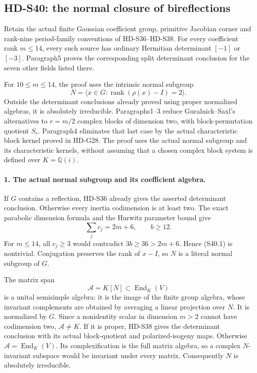 \subsection{HD-S40: the normal closure of bireflections}
\label{sec:bireflection-normal-closure}

Retain the actual finite Gaussian coefficient group, primitive
Jacobian corner and rank-nine period-family conventions of
HD-S36--HD-S38. For every coefficient rank \(m\le14\),
every such source has ordinary Hermitian determinant \([-1]\)
or \([-3]\). Paragraph5 proves the corresponding split
determinant conclusion for the seven other fields listed there.

For \(10\le m\le14\), the proof uses the intrinsic normal
subgroup
\[
 N=\langle x\in G:\operatorname{rank}(\rho(x)-I)=2\rangle.
                                                               \tag{S40.1}
\]
Outside the determinant conclusions already proved using proper
normalized algebras, it is absolutely irreducible. Paragraphs1--3
reduce Guralnick--Saxl's alternatives to \(r=m/2\) complex
blocks of dimension two, with block-permutation quotient \(S_r\).
Paragraph4 eliminates that last case by the actual characteristic
block kernel proved in HD-G28. The proof uses the actual normal
subgroup and its characteristic kernels, without assuming that
a chosen complex block system is defined over \(K=\mathbb Q(i)\).

\paragraph{1. The actual normal subgroup and its coefficient algebra.}
If \(G\) contains a reflection, HD-S36 already gives the
asserted determinant conclusion. Otherwise every inertia
codimension is at least two. The exact parabolic dimension
formula and the Hurwitz parameter bound give
\[
             \sum_j c_j=2m+6,\qquad b\ge12.                 \tag{S40.2}
\]
For \(m\le14\), all \(c_j\ge3\) would contradict
\(3b\ge36>2m+6\). Hence (S40.1) is nontrivial.
Conjugation preserves the rank of \(x-I\), so \(N\) is a
literal normal subgroup of \(G\).

The matrix span
\[
                 \mathcal A=K[N]\subset\operatorname{End}_K(V)
                                                               \tag{S40.3}
\]
is a unital semisimple algebra: it is the image of the finite
group algebra, whose invariant complements are obtained by
averaging a linear projection over \(N\). It is normalized by
\(G\). Since a nonidentity scalar in dimension \(m>2\)
cannot have codimension two, \(\mathcal A\ne K\).
If it is proper, HD-S38 gives the determinant conclusion with
its actual block-quotient and polarized-isogeny maps. Otherwise
\(\mathcal A=\operatorname{End}_K(V)\). Its complexification
is the full matrix algebra, so a complex \(N\)-invariant
subspace would be invariant under every matrix. Consequently
\(N\) is absolutely irreducible.


